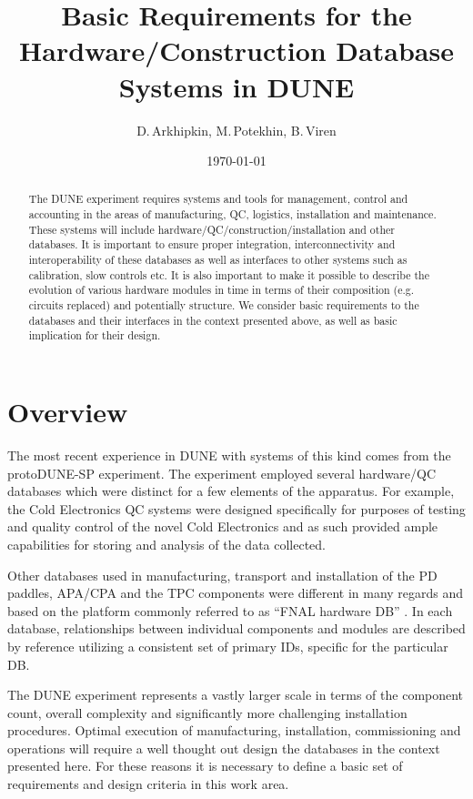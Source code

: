\documentclass[pdftex,12pt,letter]{article}
\title{Basic Requirements for the Hardware/Construction Database Systems in DUNE}
\date{\today}
\author{D.\,Arkhipkin, M.\,Potekhin, B.\,Viren}
\begin{document}
\maketitle

\begin{abstract}
\noindent  The DUNE experiment requires systems and tools for management, control
and accounting  in the areas of manufacturing, QC, logistics, installation and maintenance.
These systems will include hardware/QC/construction/installation and other databases.
It is important to ensure proper integration, interconnectivity and interoperability of these
databases  as well as interfaces to other systems such as calibration, slow controls etc.
It is also important to make it possible to describe the evolution of various hardware modules
in time in terms of their composition (e.g. circuits replaced) and potentially structure.
We consider basic requirements to the databases and their interfaces  in the context
presented above, as well as basic implication for their design.


\end{abstract}


\section{Overview}

The most recent experience in DUNE with systems of this kind comes from the protoDUNE-SP
experiment. The experiment employed several hardware/QC databases which were distinct
for a few elements of the apparatus. For example, the Cold Electronics QC systems were designed specifically
for purposes of testing and quality control of the novel Cold Electronics and as such provided ample capabilities
for storing and analysis of the data collected.

Other databases used in manufacturing, transport and installation of the PD paddles, APA/CPA and the TPC
components were different in many regards and based on the platform commonly referred to as
``FNAL hardware DB'' \cite{hardwareDB}. In each database, relationships between individual components
and modules are described by reference utilizing a consistent set of primary IDs, specific for the particular DB.

The DUNE experiment represents a vastly larger scale in terms of the component count,
overall complexity and significantly more challenging installation procedures. Optimal execution
of manufacturing, installation, commissioning and operations will require a well thought out design
the databases in the context presented here. For these reasons it is necessary to define a
basic set of requirements and design criteria in this work area.
\end{document}
